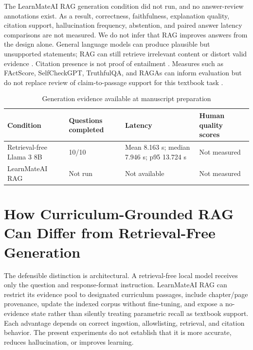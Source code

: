 \documentclass[conference]{IEEEtran}
\begin{document}
The LearnMateAI RAG generation condition did not run, and no answer-review annotations exist. As a result, correctness, faithfulness, explanation quality, citation support, hallucination frequency, abstention, and paired answer latency comparisons are not measured. We do not infer that RAG improves answers from the design alone. General language models can produce plausible but unsupported statements; RAG can still retrieve irrelevant content or distort valid evidence \cite{r34,r20,r30}. Citation presence is not proof of entailment \cite{r9,r30}. Measures such as FActScore, SelfCheckGPT, TruthfulQA, and RAGAs can inform evaluation but do not replace review of claim-to-passage support for this textbook task \cite{r31,r32,r33,r10}.

\begin{table}[t]
\caption{Generation evidence available at manuscript preparation}
\label{tab:generation-results}
\centering\footnotesize
\begin{tabular}{p{}p{}p{}p{}}
\hline
Condition & Questions completed & Latency & Human quality scores\\ \hline
Retrieval-free Llama 3 8B & 10/10 & Mean 8.163 s; median 7.946 s; p95 13.724 s & Not measured\\
LearnMateAI RAG & Not run & Not available & Not measured\\
\hline
\end{tabular}
\end{table}

\section{How Curriculum-Grounded RAG Can Differ from Retrieval-Free Generation}
The defensible distinction is architectural. A retrieval-free local model receives only the question and response-format instruction. LearnMateAI RAG can restrict its evidence pool to designated curriculum passages, include chapter/page provenance, update the indexed corpus without fine-tuning, and expose a no-evidence state rather than silently treating parametric recall as textbook support. Each advantage depends on correct ingestion, allowlisting, retrieval, and citation behavior. The present experiments do not establish that it is more accurate, reduces hallucination, or improves learning.
\end{document}
